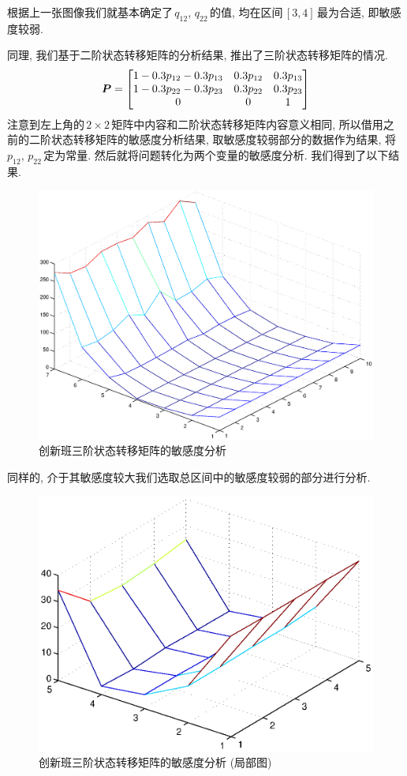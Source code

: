 \documentclass[a4paper]{article}
\renewcommand{\matrix}{\matrixsym} %
\begin{document}
  根据上一张图像我们就基本确定了\,$q_{12}$, $q_{22}$\,的值, 均在区间\,$[3,4]$\,最为合适, 即敏感度较弱.\par
  同理, 我们基于二阶状态转移矩阵的分析结果, 推出了三阶状态转移矩阵的情况.
  \begin{equation}
  \matrix{P}=
  \begin{bmatrix}
  1-0.3p_{12}-0.3p_{13} & 0.3p_{12} & 0.3p_{13} \\
  1-0.3p_{22}-0.3p_{23} & 0.3p_{22} & 0.3p_{23} \\
  0 & 0 & 1
  \end{bmatrix}
  \end{equation}
  注意到左上角的\,$2\times2$\,矩阵中内容和二阶状态转移矩阵内容意义相同, 所以借用之前的二阶状态转移矩阵的敏感度分析结果, 取敏感度较弱部分的数据作为结果, 将\,$p_{12}$, $p_{22}$\,定为常量. 然后就将问题转化为两个变量的敏感度分析. 我们得到了以下结果.
  \begin{figure}[H]
  \centerline{\includegraphics[scale=0.5]{inno3.eps}}
  \caption{创新班三阶状态转移矩阵的敏感度分析}
  \end{figure}
  同样的, 介于其敏感度较大我们选取总区间中的敏感度较弱的部分进行分析.
  \begin{figure}[H]
  \centerline{\includegraphics[scale=0.7]{inno3part.eps}}
  \caption{创新班三阶状态转移矩阵的敏感度分析 (局部图)}
  \end{figure}
\end{document}
